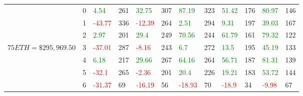 \begin{table}[htb!]
\begin{adjustwidth}{-0.9in}{-0.9in}
\begin{tabular}{|p{5em}|p{2em}|p{3em}|p{3em}|p{3em}|p{3em}|p{3em}|p{3em}|p{3em}|p{3em}|p{3em}|p{3em}|}
            & 0 & \textcolor{green}{4.54} & 261 & \textcolor{green}{32.75} & 307 & \textcolor{green}{87.19} & 323 & \textcolor{green}{51.42} & 176 & \textcolor{green}{80.97} & 146\\\cline{3-12}
            & 1 & \textcolor{red}{-43.77} & 336 & \textcolor{red}{-12.39} & 264 & \textcolor{green}{2.51} & 294 & \textcolor{green}{9.31} & 197 & \textcolor{green}{39.03} & 167\\\cline{3-12}
            & 2 & \textcolor{green}{2.97} & 201 & \textcolor{green}{29.4} & 249 & \textcolor{green}{70.56} & 244 & \textcolor{green}{61.79} & 161 & \textcolor{green}{79.32} & 122\\\cline{3-12}
            $75 ETH = \$295,969.50$ & 3 & \textcolor{red}{-37.01} & 287 & \textcolor{red}{-8.16} & 243 & \textcolor{green}{6.7} & 272 & \textcolor{green}{13.5} & 195 & \textcolor{green}{45.19} & 133\\[-3ex]\cline{3-12}
            & 4 & \textcolor{green}{6.18} & 217 & \textcolor{green}{29.66} & 267 & \textcolor{green}{64.16} & 264 & \textcolor{green}{56.71} & 187 & \textcolor{green}{81.31} & 139\\\cline{3-12}
            & 5 & \textcolor{red}{-32.1} & 265 & \textcolor{red}{-2.36} & 201 & \textcolor{green}{20.4} & 226 & \textcolor{green}{19.21} & 183 & \textcolor{green}{53.72} & 144\\\cline{3-12}
            & 6 & \textcolor{red}{-31.37} & 69 & \textcolor{red}{-16.19} & 56 & \textcolor{red}{-18.93} & 70 & \textcolor{red}{-18.9} & 34 & \textcolor{red}{-9.98} & 67\\\hline\hline


\end{tabular}
\end{adjustwidth}
\end{table}
